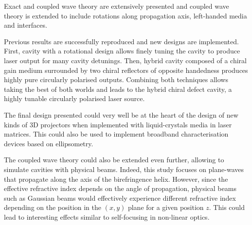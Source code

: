 Exact and coupled wave theory are extensively presented and coupled wave theory is extended to include rotations along propagation axis, left-handed media and interfaces. 

Previous results are successfully reproduced and new designs are implemented. First, cavity with a rotational design allows finely tuning the cavity to produce laser output for many cavity detunings. Then, hybrid cavity composed of a chiral gain medium surrounded by two chiral reflectors of opposite handedness produces highly pure circularly polarised outputs. Combining both techniques allows taking the best of both worlds and leads to the hybrid chiral defect cavity, a highly tunable circularly polarised laser source. 

The final design presented could very well be at the heart of the design of new kinds of 3D projectors when implemented with liquid-crystals media in laser matrices. This could also be used to implement broadband characterisation devices based on ellipsometry. 

The coupled wave theory could also be extended even further, allowing to simulate cavities with physical beams. Indeed, this study focuses on plane-waves that propagate along the axis of the birefringence helix. However, since the effective refractive index depends on the angle of propagation, physical beams such as Gaussian beams would effectively experience different refractive index depending on the position in the $(x,y)$ plane for a given position $z$. This could lead to interesting effects similar to self-focusing in non-linear optics\cites{poy_chirality-enhanced_2020}{shishkov_polarisation_2020}.